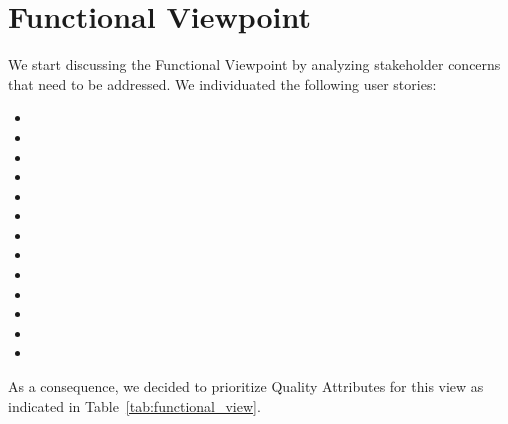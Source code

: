

\section{Functional Viewpoint}\label{sec:functional}

We start discussing the Functional Viewpoint by analyzing stakeholder concerns that need to be addressed.
We individuated the following user stories:
\begin{itemize}[noitemsep]
    \item \userStoryOne
    \item \userStoryFour
    \item \userStorySix
    \item \userStorySeven
    \item \userStoryNine
    \item \userStoryTen
    \item \userStoryTwelve
    \item \userStorySixteen
    \item \userStoryTwenty
    \item \userStoryTwentySix
    \item \userStoryTwentySeven
    \item \userStoryThirtyNine
    \item \userStoryFortyOne
  \end{itemize}
  

As a consequence, we decided to prioritize Quality Attributes for this view as indicated in Table~\ref{tab:functional_view}.
\begin{table}[h!]
    \centering
    \caption{Functional View Prioritized Quality Attributes}
    \label{tab:functional_view}
\end{table}


